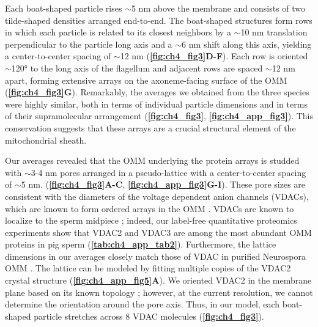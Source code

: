 Each boat-shaped particle rises $\sim$5 nm above the membrane and consists of two tilde-shaped densities arranged end-to-end. The boat-shaped structures form rows in which each particle is related to its closest neighbors by a $\sim$10 nm translation perpendicular to the particle long axis and a $\sim$6 nm shift along this axis, yielding a center-to-center spacing of $\sim$12 nm (\textbf{\autoref{fig:ch4_fig3}D-F}). Each row is oriented $\sim$120° to the long axis of the flagellum and adjacent rows are spaced $\sim$12 nm apart, forming extensive arrays on the axoneme-facing surface of the OMM (\textbf{\autoref{fig:ch4_fig3}G}). Remarkably, the averages we obtained from the three species were highly similar, both in terms of individual particle dimensions and in terms of their supramolecular arrangement (\textbf{\autoref{fig:ch4_fig3}}, \textbf{\autoref{fig:ch4_app_fig3}}). This conservation suggests that these arrays are a crucial structural element of the mitochondrial sheath.

Our averages revealed that the OMM underlying the protein arrays is studded with $\sim$3-4 nm pores arranged in a pseudo-lattice with a center-to-center spacing of $\sim$5 nm. (\textbf{\autoref{fig:ch4_fig3}A-C}, \textbf{\autoref{fig:ch4_app_fig3}G-I}). These pore sizes are consistent with the diameters of the voltage dependent anion channels (VDACs), which are known to form ordered arrays in the OMM \cite{Guo1993, Hoogenboom2007, Goncalves2007, Mannella1982}. VDACs are known to localize to the sperm midpiece \cite{Kwon2013, Arcelay2008}; indeed, our label-free quantitative proteomics experiments show that VDAC2 and VDAC3 are among the most abundant OMM proteins in pig sperm (\textbf{\autoref{tab:ch4_app_tab2}}). Furthermore, the lattice dimensions in our averages closely match those of VDAC in purified Neurospora OMM \cite{Guo1993, Mannella1998}. The lattice can be modeled by fitting multiple copies of the VDAC2 crystal structure \cite{Schredelseker2014} (\textbf{\autoref{fig:ch4_app_fig5}A}). We oriented VDAC2 in the membrane plane based on its known topology \cite{Tomasello2013, Bayrhuber2008}; however, at the current resolution, we cannot determine the orientation around the pore axis. Thus, in our model, each boat-shaped particle stretches across 8 VDAC molecules (\textbf{\autoref{fig:ch4_fig3}}).

